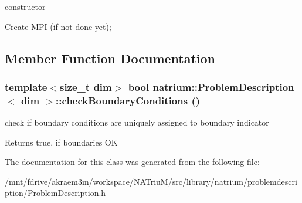 constructor 

Create MPI (if not done yet); 

\subsection{Member Function Documentation}
\hypertarget{classnatrium_1_1ProblemDescription_aed8ec93fcba6c0b78c04ef91b8703f7a}{
\subsubsection[{checkBoundaryConditions}]{\setlength{\rightskip}{0pt plus 5cm}template$<$size\_\-t dim$>$ bool {\bf natrium::ProblemDescription}$<$ dim $>$::checkBoundaryConditions ()}}
\label{classnatrium_1_1ProblemDescription_aed8ec93fcba6c0b78c04ef91b8703f7a}


check if boundary conditions are uniquely assigned to boundary indicator \begin{DoxyReturn}{Returns}
true, if boundaries OK 
\end{DoxyReturn}


The documentation for this class was generated from the following file:\begin{DoxyCompactItemize}
\item 
/mnt/fdrive/akraem3m/workspace/NATriuM/src/library/natrium/problemdescription/\hyperlink{ProblemDescription_8h}{ProblemDescription.h}\end{DoxyCompactItemize}
